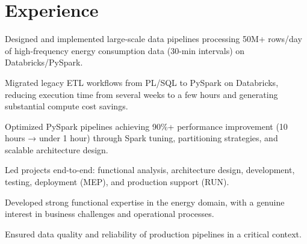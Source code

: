 \documentclass[]{plushcv}
\begin{document}
\begin{minipage}[t]{0.74\textwidth}



\section{Experience}

\hfill
{}
\vspace{\topsep} %
\begin{tightemize}
\sectionsep
\item Designed and implemented large-scale data pipelines processing 50M+ rows/day of high-frequency energy consumption data (30-min intervals) on Databricks/PySpark.

\item Migrated legacy ETL workflows from PL/SQL to PySpark on Databricks, reducing execution time from several weeks to a few hours and generating substantial compute cost savings.

\item Optimized PySpark pipelines achieving 90\%+ performance improvement (10 hours → under 1 hour) through Spark tuning, partitioning strategies, and scalable architecture design.

\item Led projects end-to-end: functional analysis, architecture design, development, testing, deployment (MEP), and production support (RUN).

\item Developed strong functional expertise in the energy domain, with a genuine interest in business challenges and operational processes.

\item Ensured data quality and reliability of production pipelines in a critical context.
\end{tightemize}
\sectionsep
\sectionsep



\end{minipage}
\end{document}
